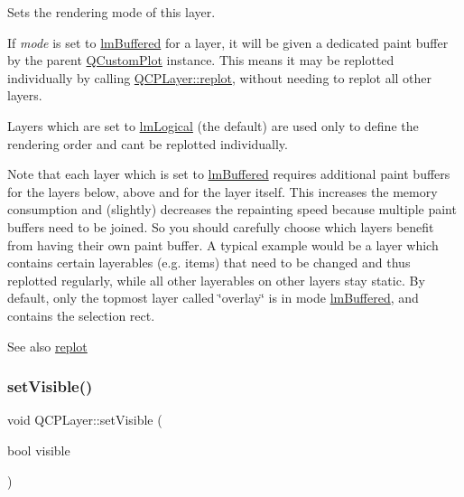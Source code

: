 Sets the rendering mode of this layer.

If {\itshape mode} is set to \hyperlink{class_q_c_p_layer_a67dcfc1590be2a1f2227c5a39bb59c7cab581b9fab3007c4c65f057f4185d7538}{lm\+Buffered} for a layer, it will be given a dedicated paint buffer by the parent \hyperlink{class_q_custom_plot}{Q\+Custom\+Plot} instance. This means it may be replotted individually by calling \hyperlink{class_q_c_p_layer_adefd53b6db02f470151c416f42e37180}{Q\+C\+P\+Layer\+::replot}, without needing to replot all other layers.

Layers which are set to \hyperlink{class_q_c_p_layer_a67dcfc1590be2a1f2227c5a39bb59c7ca02eb5e9a4cb7f1baf1e2b6b99e3b87ce}{lm\+Logical} (the default) are used only to define the rendering order and can\textquotesingle{}t be replotted individually.

Note that each layer which is set to \hyperlink{class_q_c_p_layer_a67dcfc1590be2a1f2227c5a39bb59c7cab581b9fab3007c4c65f057f4185d7538}{lm\+Buffered} requires additional paint buffers for the layers below, above and for the layer itself. This increases the memory consumption and (slightly) decreases the repainting speed because multiple paint buffers need to be joined. So you should carefully choose which layers benefit from having their own paint buffer. A typical example would be a layer which contains certain layerables (e.\+g. items) that need to be changed and thus replotted regularly, while all other layerables on other layers stay static. By default, only the topmost layer called \char`\"{}overlay\char`\"{} is in mode \hyperlink{class_q_c_p_layer_a67dcfc1590be2a1f2227c5a39bb59c7cab581b9fab3007c4c65f057f4185d7538}{lm\+Buffered}, and contains the selection rect.

\begin{DoxySeeAlso}{See also}
\hyperlink{class_q_c_p_layer_adefd53b6db02f470151c416f42e37180}{replot} 
\end{DoxySeeAlso}
\mbox{\label{class_q_c_p_layer_ac07671f74edf6884b51a82afb2c19516}} 
\subsubsection{\texorpdfstring{set\+Visible()}{setVisible()}}
{\footnotesize\ttfamily void Q\+C\+P\+Layer\+::set\+Visible (\begin{DoxyParamCaption}\item[{bool}]{visible }\end{DoxyParamCaption})}

